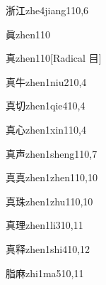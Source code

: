 \begin{verbete}{浙江}{zhe4jiang1}{10,6}
\end{verbete}

\begin{verbete}{眞}{zhen1}{10}
\end{verbete}

\begin{verbete}{真}{zhen1}{10}[Radical 目]
\end{verbete}

\begin{verbete}{真牛}{zhen1niu2}{10,4}
\end{verbete}

\begin{verbete}{真切}{zhen1qie4}{10,4}
\end{verbete}

\begin{verbete}{真心}{zhen1xin1}{10,4}
\end{verbete}

\begin{verbete}{真声}{zhen1sheng1}{10,7}
\end{verbete}

\begin{verbete}{真真}{zhen1zhen1}{10,10}
\end{verbete}

\begin{verbete}{真珠}{zhen1zhu1}{10,10}
\end{verbete}

\begin{verbete}{真理}{zhen1li3}{10,11}
\end{verbete}

\begin{verbete}{真释}{zhen1shi4}{10,12}
\end{verbete}

\begin{verbete}{脂麻}{zhi1ma5}{10,11}
\end{verbete}

